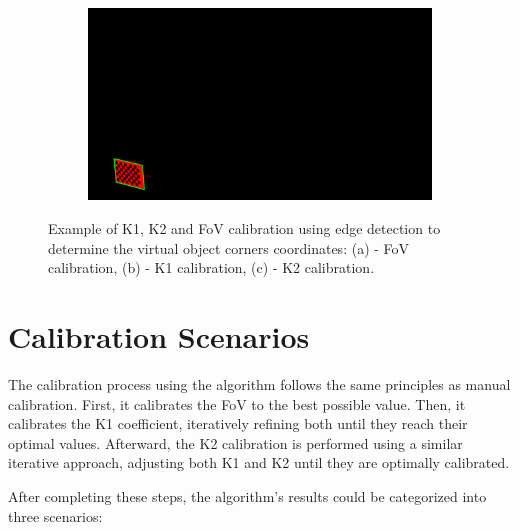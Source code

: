 \begin{figure}[h]
    \begin{subfigure}[b]{0.45\textwidth}
        \includegraphics[width=\textwidth]{Images/04calibration/11.png}
        \caption{}
        \label{fig:c2}
    \end{subfigure}

    \caption{Example of K1, K2 and \ac{FoV} calibration using edge detection to determine the virtual object corners coordinates: (a) - \ac{FoV} calibration, (b) - K1 calibration, (c) - K2 calibration.}
    \label{fig:vir_fov_cal}
\end{figure}




\section{Calibration Scenarios} \label{sec:Calibration Scenarios}

\noindent The calibration process using the algorithm follows the same principles as manual calibration. First, it calibrates the \ac{FoV} to the best possible value. Then, it calibrates the K1 coefficient, iteratively refining both until they reach their optimal values. Afterward, the K2 calibration is performed using a similar iterative approach, adjusting both K1 and K2 until they are optimally calibrated.

\noindent After completing these steps, the algorithm’s results could be categorized into three scenarios:

